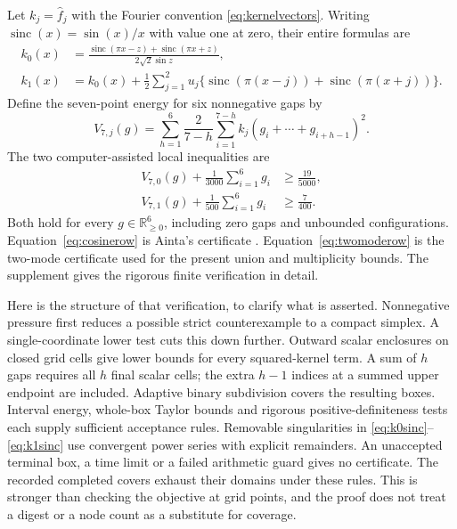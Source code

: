 \documentclass[11pt]{amsart}
\numberwithin{equation}{section}
\newcommand{\R}{\mathbb R}
\begin{document}
Let $k_j=\widehat f_j$ with the Fourier convention
\eqref{eq:kernelvectors}. Writing $\operatorname{sinc}(x)=\sin(x)/x$
with value one at zero, their entire formulas are
\begin{align}
 k_0(x)&=\frac{\operatorname{sinc}(\pi x-z)
                    +\operatorname{sinc}(\pi x+z)}{2\sqrt2\sin z},
 \label{eq:k0sinc}\\
 k_1(x)&=k_0(x)+\frac12\sum_{j=1}^2u_j
       \bigl\{\operatorname{sinc}(\pi(x-j))
                     +\operatorname{sinc}(\pi(x+j))\bigr\}.
 \label{eq:k1sinc}
\end{align}
Define the seven-point energy for six nonnegative gaps by
\begin{equation}
 V_{7,j}(g)=\sum_{h=1}^{6}\frac2{7-h}
     \sum_{i=1}^{7-h}k_j(g_i+\cdots+g_{i+h-1})^2.
 \label{eq:sevenenergy}
\end{equation}
The two computer-assisted local inequalities are
\begin{align}
 V_{7,0}(g)+\frac1{3000}\sum_{i=1}^6g_i
 &\ge\frac{19}{5000},\label{eq:cosinerow}\\
 V_{7,1}(g)+\frac1{500}\sum_{i=1}^6g_i
 &\ge\frac7{400}.\label{eq:twomoderow}
\end{align}
Both hold for every $g\in\R_{\ge0}^6$, including zero gaps and
unbounded configurations. Equation~\eqref{eq:cosinerow} is Ainta's
certificate \cite{Ainta}. Equation~\eqref{eq:twomoderow} is the
two-mode certificate used for the present union and multiplicity bounds.
The supplement gives the rigorous finite verification in detail.

Here is the structure of that verification, to clarify what is asserted.
Nonnegative pressure first reduces a possible strict counterexample to a
compact simplex. A single-coordinate lower test cuts this down further.
Outward scalar enclosures on closed grid cells give lower bounds for
every squared-kernel term. A sum of $h$ gaps requires all $h$ final
scalar cells; the extra $h-1$ indices at a summed upper endpoint are
included. Adaptive binary subdivision covers the resulting boxes.
Interval energy, whole-box Taylor bounds and rigorous positive-definiteness
tests each supply sufficient acceptance rules. Removable singularities in
\eqref{eq:k0sinc}--\eqref{eq:k1sinc} use convergent power series with
explicit remainders. An unaccepted terminal box, a time limit or a failed
arithmetic guard gives no certificate. The recorded completed covers
exhaust their domains under these rules. This is stronger than checking
the objective at grid points, and the proof does not treat a digest or a
node count as a substitute for coverage.
\end{document}
